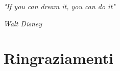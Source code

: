 \cleardoublepage



\bigskip

\begingroup

\let\clearpage\relax

\let\cleardoublepage\relax

\let\cleardoublepage\relax

\epigraph{\textit{"If you can dream it, you can do it"}}{\textit{Walt Disney}}

\chapter*{Ringraziamenti}

